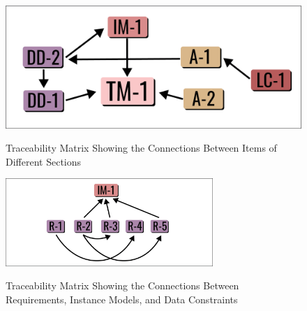 \documentclass[12pt]{article}
\begin{document}
\begin{figure}[h!]
	\begin{center}
		{
			\includegraphics[width=\textwidth]{sublimat_atrace.png}
		}
		\caption{\label{Fig_ATrace} Traceability Matrix Showing the Connections Between Items of Different Sections}
	\end{center}
\end{figure}


\begin{figure}[h!]
	\begin{center}
		{
			\includegraphics[width=0.7\textwidth]{sublimat_rtrace.png}
		}
		\caption{\label{Fig_RTrace} Traceability Matrix Showing the Connections Between Requirements, Instance Models, and Data Constraints}
	\end{center}
\end{figure}


\end{document}
